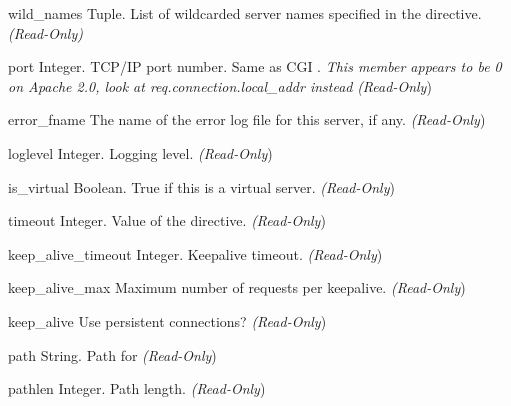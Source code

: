 \begin{memberdesc}[server]{wild_names}
  Tuple. List of wildcarded server names specified in the 
  directive. \emph{(Read-Only)}
\end{memberdesc}

\begin{memberdesc}[server]{port}
  Integer. TCP/IP port number. Same as CGI .
  \emph{This member appears to be 0 on Apache 2.0, look at req.connection.local_addr instead}
  \emph{(Read-Only})
\end{memberdesc}

\begin{memberdesc}[server]{error_fname}
  The name of the error log file for this server, if any.
  \emph{(Read-Only})
\end{memberdesc}

\begin{memberdesc}[server]{loglevel}
  Integer. Logging level.
  \emph{(Read-Only})
\end{memberdesc}

\begin{memberdesc}[server]{is_virtual}
  Boolean. True if this is a virtual server.
  \emph{(Read-Only})
\end{memberdesc}

\begin{memberdesc}[server]{timeout}
  Integer. Value of the  directive.
  \emph{(Read-Only})
\end{memberdesc}

\begin{memberdesc}[server]{keep_alive_timeout}
  Integer. Keepalive timeout.
  \emph{(Read-Only})
\end{memberdesc}

\begin{memberdesc}[server]{keep_alive_max}
  Maximum number of requests per keepalive.
  \emph{(Read-Only})
\end{memberdesc}

\begin{memberdesc}[server]{keep_alive}
  Use persistent connections?
  \emph{(Read-Only})
\end{memberdesc}

\begin{memberdesc}[server]{path}
  String. Path for 
  \emph{(Read-Only})
\end{memberdesc}

\begin{memberdesc}[server]{pathlen}
  Integer. Path length.
  \emph{(Read-Only})
\end{memberdesc}

